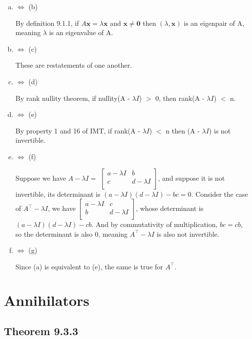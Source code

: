 \documentclass[12pt, letterpaper]{article}
\begin{document}
\begin{enumerate}[(a)]
    \item $\Leftrightarrow$ (b) 
    
    By definition 9.1.1, if $A\mathbf{x}=\lambda\mathbf{x}$ and $\mathbf{x}\neq\mathbf{0}$ then $(\lambda,\mathbf{x})$
    is an eigenpair of A, meaning $\lambda$ is an eigenvalue of A.
    \item $\Leftrightarrow$ (c)
    
    These are restatements of one another.
    \item $\Leftrightarrow$ (d)
    
    By rank nullity theorem, if nullity(A - $\lambda I$) $>$ 0, then rank(A - $\lambda I$) $<$ n.
    \item $\Leftrightarrow$ (e) 
    
    By property 1 and 16 of IMT, if rank(A - $\lambda I$) $<$ n then (A - $\lambda I$) is not invertible.
    \item $\Leftrightarrow$ (f)
    
    Suppose we have $A - \lambda I = $ 
    $\begin{bmatrix}
        a - \lambda I & b  \\
        c & d - \lambda I  \\
    \end{bmatrix}$, 
    and suppose it is not invertible, its determinant is $(a - \lambda I)(d - \lambda I) - bc = 0$. Consider the case of $A^\top - \lambda I$, we have 
    $\begin{bmatrix}
        a - \lambda I & c  \\
        b & d - \lambda I  \\
    \end{bmatrix}$, 
    whose determinant is $(a - \lambda I)(d - \lambda I) - cb$. And by commutativity of multiplication, $bc = cb$, so the determinant is also 0, meaning $A^\top - \lambda I$ is also not invertible.

    \item $\Leftrightarrow$ (g)
    
    Since (a) is equivalent to (e), the same is true for $A^\top$.
\end{enumerate}

\section{Annihilators}
\subsection{Theorem 9.3.3}
\end{document}
